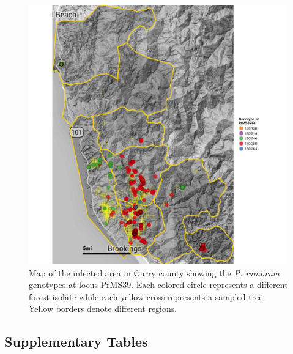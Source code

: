 \documentclass[double,11pt]{beavtex}
\begin{document}
  \begin{figure}
  
  {\centering \includegraphics[width=0.8\linewidth]{figure/phytopathology/figureS10} 
  
  }
  
  \caption[Map of the infected area in Curry county showing the \emph{P. ramorum}
  genotypes at locus PrMS39.]{Map of the infected area in Curry county showing the \emph{P. ramorum}
  genotypes at locus PrMS39. Each colored circle represents a different
  forest isolate while each yellow cross represents a sampled tree. Yellow
  borders denote different regions.}\label{fig:ramS10}
  \end{figure}
  
  \subsection{Supplementary Tables}\label{supplementary-tables}
  
\end{document}
